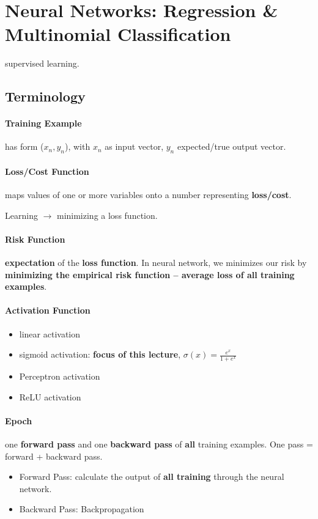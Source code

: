 \section{Neural Networks: Regression \& Multinomial Classification}
supervised learning. 
\subsection{Terminology}
\paragraph{Training Example} has form ($x_n, y_n$), with $x_n$ as input vector, $y_n$ expected/true output vector.

\paragraph{Loss/Cost Function} maps values of one or more variables onto a number representing \textbf{loss/cost}.

Learning $\rightarrow$ minimizing a loss function.

\paragraph{Risk Function} \textbf{expectation} of the \textbf{loss function}. In neural network, we minimizes our risk by  \textbf{minimizing the empirical risk function -- average loss of all training examples}.

\paragraph{Activation Function} 
\begin{itemize}
	\item linear activation  
	\item sigmoid activation: \textbf{focus of this lecture},  $\sigma(x) = \frac{e^x}{1 + e^x}$
	\item Perceptron activation
	\item ReLU activation
\end{itemize}
\paragraph{Epoch} one \textbf{forward pass} and one \textbf{backward pass} of \textbf{all} training examples. One pass = forward + backward pass.
\begin{itemize}
	\item Forward Pass: calculate the output of \textbf{all training } through the neural network.
	\item Backward Pass: Backpropagation 
\end{itemize}

